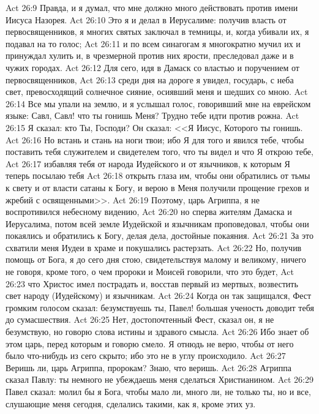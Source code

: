 \vs Act 26:9 Правда, и я думал, что мне должно много действовать против имени Иисуса Назорея.
\vs Act 26:10 Это я и делал в Иерусалиме: получив власть от первосвященников, я многих святых заключал в темницы, и, когда убивали их, я подавал на то голос;
\vs Act 26:11 и по всем синагогам я многократно мучил их и принуждал хулить  и, в чрезмерной против них ярости, преследовал даже и в чужих городах.
\vs Act 26:12 Для сего, идя в Дамаск со властью и поручением от первосвященников,
\vs Act 26:13 среди дня на дороге я увидел, государь, с неба свет, превосходящий солнечное сияние, осиявший меня и шедших со мною.
\vs Act 26:14 Все мы упали на землю, и я услышал голос, говоривший мне на еврейском языке: Савл, Савл! что ты гонишь Меня? Трудно тебе идти против рожна.
\vs Act 26:15 Я сказал: кто Ты, Господи? Он сказал: <<Я Иисус, Которого ты гонишь.
\vs Act 26:16 Но встань и стань на ноги твои; ибо Я для того и явился тебе, чтобы поставить тебя служителем и свидетелем того, что ты видел и что Я открою тебе,
\vs Act 26:17 избавляя тебя от народа Иудейского и от язычников, к которым Я теперь посылаю тебя
\vs Act 26:18 открыть глаза им, чтобы они обратились от тьмы к свету и от власти сатаны к Богу, и верою в Меня получили прощение грехов и жребий с освященными>>.
\vs Act 26:19 Поэтому, царь Агриппа, я не воспротивился небесному видению,
\vs Act 26:20 но сперва жителям Дамаска и Иерусалима, потом всей земле Иудейской и язычникам проповедовал, чтобы они покаялись и обратились к Богу, делая дела, достойные покаяния.
\vs Act 26:21 За это схватили меня Иудеи в храме и покушались растерзать.
\vs Act 26:22 Но, получив помощь от Бога, я до сего дня стою, свидетельствуя малому и великому, ничего не говоря, кроме того, о чем пророки и Моисей говорили, что это будет,
\vs Act 26:23  что Христос имел пострадать и, восстав первый из мертвых, возвестить свет народу (Иудейскому) и язычникам.
\vs Act 26:24 Когда он так защищался, Фест громким голосом сказал: безумствуешь ты, Павел! большая ученость доводит тебя до сумасшествия.
\vs Act 26:25 Нет, достопочтенный Фест, сказал он, я не безумствую, но говорю слова истины и здравого смысла.
\vs Act 26:26 Ибо знает об этом царь, перед которым и говорю смело. Я отнюдь не верю, чтобы от него было что-нибудь из сего скрыто; ибо это не в углу происходило.
\vs Act 26:27 Веришь ли, царь Агриппа, пророкам? Знаю, что веришь.
\vs Act 26:28 Агриппа сказал Павлу: ты немного не убеждаешь меня сделаться Христианином.
\vs Act 26:29 Павел сказал: молил бы я Бога, чтобы мало ли, много ли, не только ты, но и все, слушающие меня сегодня, сделались такими, как я, кроме этих уз.
